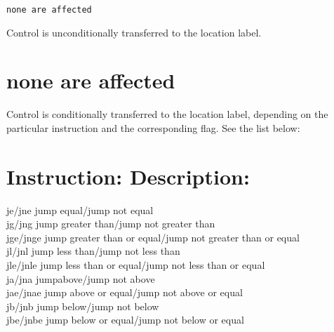 \documentclass[10pt]{article}
\begin{document}
\begin{verbatim}
none are affected
\end{verbatim}

Control is unconditionally transferred to the location label.

\section*{none are affected}
Control is conditionally transferred to the location label, depending on the particular instruction and the corresponding flag. See the list below:

\section*{Instruction: Description:}
je/jne jump equal/jump not equal\\
jg/jng jump greater than/jump not greater than\\
jge/jnge jump greater than or equal/jump not greater than or equal\\
jl/jnl jump less than/jump not less than\\
jle/jnle jump less than or equal/jump not less than or equal\\
ja/jna jumpabove/jump not above\\
jae/jnae jump above or equal/jump not above or equal\\
jb/jnb jump below/jump not below\\
jbe/jnbe jump below or equal/jump not below or equal
\end{document}
